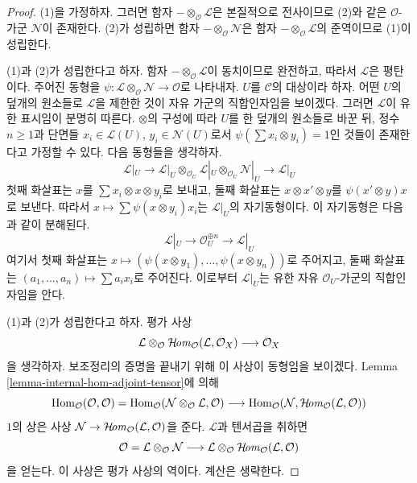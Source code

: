 \begin{proof}
(1)을 가정하자. 그러면 함자 $- \otimes_\mathcal{O} \mathcal{L}$은
본질적으로 전사이므로 (2)와 같은 $\mathcal{O}$-가군 $\mathcal{N}$이
존재한다. (2)가 성립하면 함자 $- \otimes_\mathcal{O} \mathcal{N}$은 함자
$- \otimes_\mathcal{O} \mathcal{L}$의 준역이므로 (1)이 성립한다.

\medskip\noindent
(1)과 (2)가 성립한다고 하자. 함자 $- \otimes_\mathcal{O} \mathcal{L}$이
동치이므로 완전하고, 따라서 $\mathcal{L}$은 평탄이다. 주어진 동형을
$\psi : \mathcal{L} \otimes_\mathcal{O} \mathcal{N} \to \mathcal{O}$로
나타내자. $U$를 $\mathcal{C}$의 대상이라 하자. 어떤 $U$의 덮개의
원소들로 $\mathcal{L}$을 제한한 것이 자유 가군의 직합인자임을 보이겠다.
그러면 $\mathcal{L}$이 유한 표시임이 분명히 따른다. $\otimes$의 구성에
따라 $U$를 한 덮개의 원소들로 바꾼 뒤, 정수 $n \geq 1$과 단면들
$x_i \in \mathcal{L}(U)$, $y_i \in \mathcal{N}(U)$로서
$\psi(\sum x_i \otimes y_i) = 1$인 것들이 존재한다고 가정할 수 있다.
다음 동형들을 생각하자.
$$
\mathcal{L}|_U \to
\mathcal{L}|_U \otimes_{\mathcal{O}_U}
\mathcal{L}|_U \otimes_{\mathcal{O}_U} \mathcal{N}|_U \to \mathcal{L}|_U
$$
첫째 화살표는 $x$를 $\sum x_i \otimes x \otimes y_i$로 보내고, 둘째 화살표는
$x \otimes x' \otimes y$를 $\psi(x' \otimes y)x$로 보낸다. 따라서
$x \mapsto \sum \psi(x \otimes y_i)x_i$는 $\mathcal{L}|_U$의 자기동형이다.
이 자기동형은 다음과 같이 분해된다.
$$
\mathcal{L}|_U \to \mathcal{O}_U^{\oplus n} \to \mathcal{L}|_U
$$
여기서 첫째 화살표는
$x \mapsto (\psi(x \otimes y_1), \ldots, \psi(x \otimes y_n))$로 주어지고,
둘째 화살표는 $(a_1, \ldots, a_n) \mapsto \sum a_i x_i$로 주어진다.
이로부터 $\mathcal{L}|_U$는 유한 자유 $\mathcal{O}_U$-가군의 직합인자임을
안다.

\medskip\noindent
(1)과 (2)가 성립한다고 하자. 평가 사상
$$
\mathcal{L} \otimes_\mathcal{O}
\mathop{\mathcal{H}\!\mathit{om}}\nolimits_\mathcal{O}(\mathcal{L}, \mathcal{O}_X)
\longrightarrow \mathcal{O}_X
$$
을 생각하자. 보조정리의 증명을 끝내기 위해 이 사상이 동형임을 보이겠다.
Lemma \ref{lemma-internal-hom-adjoint-tensor}에 의해
$$
\mathop{\mathrm{Hom}}\nolimits_\mathcal{O}(\mathcal{O}, \mathcal{O}) =
\mathop{\mathrm{Hom}}\nolimits_\mathcal{O}
(\mathcal{N} \otimes_\mathcal{O} \mathcal{L}, \mathcal{O})
\longrightarrow
\mathop{\mathrm{Hom}}\nolimits_\mathcal{O}
(\mathcal{N}, \mathop{\mathcal{H}\!\mathit{om}}\nolimits_\mathcal{O}(\mathcal{L}, \mathcal{O}))
$$
$1$의 상은 사상
$\mathcal{N} \to \mathop{\mathcal{H}\!\mathit{om}}\nolimits_\mathcal{O}(\mathcal{L}, \mathcal{O})$을 준다.
$\mathcal{L}$과 텐서곱을 취하면
$$
\mathcal{O} = \mathcal{L} \otimes_\mathcal{O} \mathcal{N}
\longrightarrow
\mathcal{L} \otimes_\mathcal{O} \mathop{\mathcal{H}\!\mathit{om}}\nolimits_\mathcal{O}(\mathcal{L}, \mathcal{O})
$$
을 얻는다. 이 사상은 평가 사상의 역이다. 계산은 생략한다.
\end{proof}

